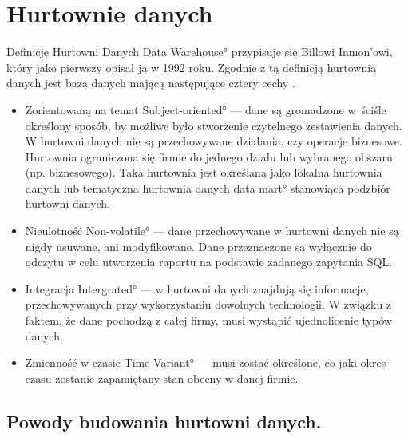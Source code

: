 \chapter{Hurtownie danych}


Definicję Hurtowni Danych \ang{Data Warehouse}  przypisuje się Billowi Inmon'owi,
 który jako pierwszy opisał ją w 1992 roku.
Zgodnie z tą definicją hurtownią danych jest baza danych mającą następujące cztery cechy \cite{TodMan}.

\begin{itemize}
 \item Zorientowaną na temat \ang{ Subject-oriented} --- 
    dane są gromadzone 
    w~ściśle określony sposób, by możliwe było stworzenie czytelnego zestawienia danych.
   W hurtowni danych nie są przechowywane działania,
    czy operacje biznesowe.
   Hurtownia ograniczona się firmie do jednego działu 
    lub wybranego obszaru (np. biznesowego).
   Taka hurtownia jest określana jako lokalna hurtownia danych 
    lub tematyczna hurtownia danych \ang{data mart} stanowiąca podzbiór hurtowni danych.
 \item Nieulotność \ang{Non-volatile} --- 
    dane przechowywane w hurtowni danych nie są nigdy usuwane, ani modyfikowane. 
   Dane przeznaczone są wyłącznie do odczytu w celu utworzenia raportu na podstawie zadanego zapytania SQL.
 \item Integracja \ang{Intergrated} --- 
    w hurtowni danych znajdują się informacje, 
    przechowywanych przy wykorzystaniu dowolnych technologii. 
    W związku z faktem, że dane pochodzą z całej firmy, musi wystąpić ujednolicenie typów danych.
 \item Zmienność w czasie \ang{Time-Variant} --- musi zostać określone,
  co jaki okres czasu zostanie zapamiętany stan obecny w danej firmie.

\end{itemize}


\section{Powody budowania hurtowni danych.}
  
